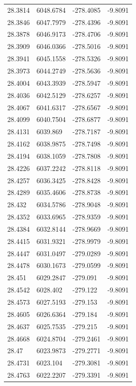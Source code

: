 \begin{table}[H]
\begin{tabular}{llll}
28.3814 & 6048.6784 & -278.4085 & -9.8091 \\
28.3846 & 6047.7979 & -278.4396 & -9.8091 \\
28.3878 & 6046.9173 & -278.4706 & -9.8091 \\
28.3909 & 6046.0366 & -278.5016 & -9.8091 \\
28.3941 & 6045.1558 & -278.5326 & -9.8091 \\
28.3973 & 6044.2749 & -278.5636 & -9.8091 \\
28.4004 & 6043.3939 & -278.5947 & -9.8091 \\
28.4036 & 6042.5129 & -278.6257 & -9.8091 \\
28.4067 & 6041.6317 & -278.6567 & -9.8091 \\
28.4099 & 6040.7504 & -278.6877 & -9.8091 \\
28.4131 & 6039.869 & -278.7187 & -9.8091 \\
28.4162 & 6038.9875 & -278.7498 & -9.8091 \\
28.4194 & 6038.1059 & -278.7808 & -9.8091 \\
28.4226 & 6037.2242 & -278.8118 & -9.8091 \\
28.4257 & 6036.3425 & -278.8428 & -9.8091 \\
28.4289 & 6035.4606 & -278.8738 & -9.8091 \\
28.432 & 6034.5786 & -278.9048 & -9.8091 \\
28.4352 & 6033.6965 & -278.9359 & -9.8091 \\
28.4384 & 6032.8144 & -278.9669 & -9.8091 \\
28.4415 & 6031.9321 & -278.9979 & -9.8091 \\
28.4447 & 6031.0497 & -279.0289 & -9.8091 \\
28.4478 & 6030.1673 & -279.0599 & -9.8091 \\
28.451 & 6029.2847 & -279.091 & -9.8091 \\
28.4542 & 6028.402 & -279.122 & -9.8091 \\
28.4573 & 6027.5193 & -279.153 & -9.8091 \\
28.4605 & 6026.6364 & -279.184 & -9.8091 \\
28.4637 & 6025.7535 & -279.215 & -9.8091 \\
28.4668 & 6024.8704 & -279.2461 & -9.8091 \\
28.47 & 6023.9873 & -279.2771 & -9.8091 \\
28.4731 & 6023.104 & -279.3081 & -9.8091 \\
28.4763 & 6022.2207 & -279.3391 & -9.8091 \\

\end{tabular}
\end{table}
